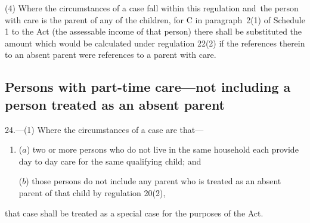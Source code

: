 \documentclass[12pt,a4paper]{article}
\begin{document}
(4) Where the circumstances of a case fall within this regulation and~the person with care is the parent of any of the children, for C in paragraph~2(1) of Schedule 1 to the Act (the assessable income of that person) there shall be substituted the amount which would be calculated under regulation 22(2) if the references therein to an absent parent were references to a parent with care.


\subsection[24. Persons with part-time care—not including a person treated as an absent parent]{Persons with part-time care—not including a person treated as an absent parent}

24.—(1) Where the circumstances of a case are that—
\begin{enumerate}\item[]
($a$) two or more persons who do not live in the same household each provide day to day care for the same qualifying child; and

($b$) those persons do not include any parent who is treated as an absent parent of that child by regulation 20(2),
\end{enumerate}
that case shall be treated as a special case for the purposes of the Act.
\end{document}
